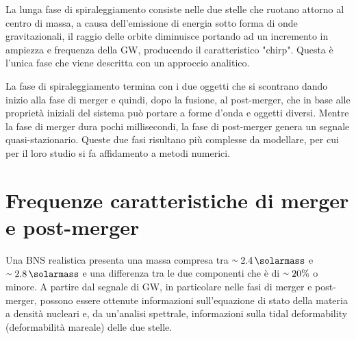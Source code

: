 La lunga fase di spiraleggiamento consiste nelle due stelle che ruotano attorno al centro di massa, a causa dell'emissione di energia sotto forma di onde gravitazionali, il raggio delle orbite diminuisce portando ad un incremento in ampiezza e frequenza della GW, producendo il caratteristico "chirp". Questa è l'unica fase che viene descritta con un approccio analitico.

La fase di spiraleggiamento termina con i due oggetti che si scontrano dando inizio alla fase di merger e quindi, dopo la fusione, al post-merger, che in base alle proprietà iniziali del sistema può portare a forme d'onda e oggetti diversi.	Mentre la fase di merger dura pochi millisecondi, la fase di post-merger genera un segnale quasi-stazionario. Queste due fasi risultano più complesse da modellare, per cui per il loro studio si fa affidamento a metodi numerici. \cite{maggiore2008gravitational}

\section[Frequenze caratteristiche]{Frequenze caratteristiche di merger e post-merger}
\label{section:frequenze_caratteristiche}
Una BNS realistica presenta una massa compresa tra $\smallsim\SI{2.4}{\solarmass}$ e $\smallsim\SI{2.8}{\solarmass}$ e una differenza tra le due componenti che è di $\smallsim20\%$ o minore. 
A partire dal segnale di GW, in particolare nelle fasi di merger e post-merger, possono essere ottenute informazioni sull'equazione di stato della materia a densità nucleari e, da un'analisi spettrale, informazioni sulla tidal deformability (deformabilità mareale) delle due stelle.

